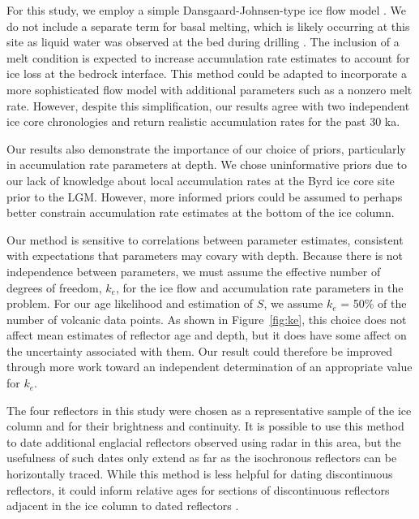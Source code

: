 For this study, we employ a simple Dansgaard-Johnsen-type ice flow model \citep{schwander2001}. We do not include a separate term for basal melting, which is likely occurring at this site as liquid water was observed at the bed during drilling \citep{gow1968}. The inclusion of a melt condition is expected to increase accumulation rate estimates to account for ice loss at the bedrock interface. This method could be adapted to incorporate a more sophisticated flow model with additional parameters such as a nonzero melt rate. However, despite this simplification, our results agree with two independent ice core chronologies and return realistic accumulation rates for the past 30 ka. 

Our results also demonstrate the importance of our choice of priors, particularly in accumulation rate parameters at depth. We chose uninformative priors due to our lack of knowledge about local accumulation rates at the Byrd ice core site prior to the LGM. However, more informed priors could be assumed to perhaps better constrain accumulation rate estimates at the bottom of the ice column. 

Our method is sensitive to correlations between parameter estimates, consistent with expectations that parameters may covary with depth. Because there is not independence between parameters, we must assume the effective number of degrees of freedom, $k_e$, for the ice flow and accumulation rate parameters in the problem.  For our age likelihood and estimation of $S$, we assume $k_e$ = 50\% of the number of volcanic data points. As shown in Figure~\ref{fig:ke}, this choice does not affect mean estimates of reflector age and depth, but it does have some affect on the uncertainty associated with them. Our result could therefore be improved through more work toward an independent determination of an appropriate value for $k_e$. 

The four reflectors in this study were chosen as a representative sample of the ice column and for their brightness and continuity. It is possible to use this method to date additional englacial reflectors observed using radar in this area, but the usefulness of such dates only extend as far as the isochronous reflectors can be horizontally traced. While this method is less helpful for dating discontinuous reflectors, it could inform relative ages for sections of discontinuous reflectors adjacent in the ice column to dated reflectors \citep[e.g.][]{macgregor2015}.

